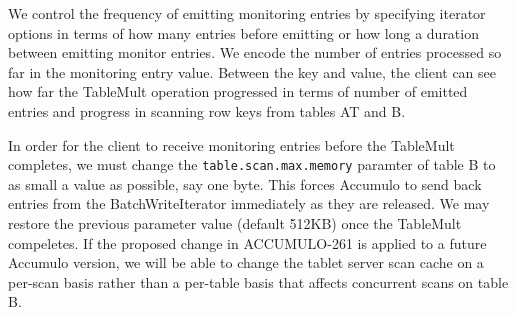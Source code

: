 We control the frequency of emitting monitoring entries by specifying iterator options in terms of how many entries
before emitting or how long a duration between emitting monitor entries. We encode the number of entries processed so far 
in the monitoring entry value. Between the key and value, the client can see how far the TableMult operation progressed
in terms of number of emitted entries and progress in scanning row keys from tables AT and B.

In order for the client to receive monitoring entries before the TableMult completes,
we must change the \texttt{table.scan.max.memory} paramter of table B to as small a value as possible, say one byte. 
This forces Accumulo to send back entries from the BatchWriteIterator immediately as they are released.
We may restore the previous parameter value (default 512KB) once the TableMult compeletes.
If the proposed change in ACCUMULO-261  is applied to a future Accumulo version,
we will be able to change the tablet server scan cache on a per-scan basis rather than a per-table basis
that affects concurrent scans on table B.



